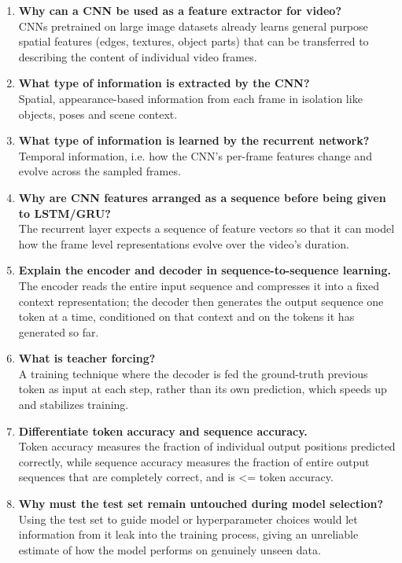 \documentclass[10pt]{article}
\begin{document}
\begin{enumerate}
\item \textbf{Why can a CNN be used as a feature extractor for video?} \\CNNs pretrained on large image datasets already learns general purpose spatial features (edges, textures, object parts) that can be transferred to describing the content of individual video frames.
\item \textbf{What type of information is extracted by the CNN?} \\Spatial, appearance-based information from each frame in isolation like objects, poses and scene context.
\item \textbf{What type of information is learned by the recurrent network?} \\Temporal information, i.e. how the CNN's per-frame features change and evolve across the sampled frames.
\item \textbf{Why are CNN features arranged as a sequence before being given to LSTM/GRU?} \\The recurrent layer expects a sequence of feature vectors so that it can model how the frame level representations evolve over the video's duration.
\item \textbf{Explain the encoder and decoder in sequence-to-sequence learning.} \\The encoder reads the entire input sequence and compresses it into a fixed context representation; the decoder then generates the output sequence one token at a time, conditioned on that context and on the tokens it has generated so far.
\item \textbf{What is teacher forcing?} \\A training technique where the decoder is fed the ground-truth previous token as input at each step, rather than its own prediction, which speeds up and stabilizes training.
\item \textbf{Differentiate token accuracy and sequence accuracy.} \\Token accuracy measures the fraction of individual output positions predicted correctly, while sequence accuracy measures the fraction of entire output sequences that are completely correct, and is <= token accuracy.
\item \textbf{Why must the test set remain untouched during model selection?} \\Using the test set to guide model or hyperparameter choices would let information from it leak into the training process, giving an unreliable estimate of how the model performs on genuinely unseen data.
\end{enumerate}
\end{document}
